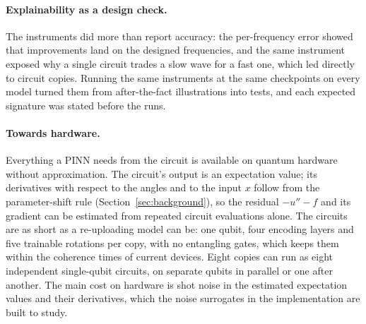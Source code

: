 \paragraph{Explainability as a design check.} The instruments did more than report
accuracy: the per-frequency error showed that improvements land on the designed
frequencies, and the same instrument exposed why a single circuit trades a slow wave for a
fast one, which led directly to circuit copies. Running the same instruments at the same
checkpoints on every model turned them from after-the-fact illustrations into tests,
and each expected signature was stated before the runs.

\paragraph{Towards hardware.} Everything a PINN needs from the circuit is available on
quantum hardware without approximation. The circuit's output is an expectation value;
its derivatives with respect to the angles and to the input $x$ follow from the
parameter-shift rule (Section~\ref{sec:background}), so the residual $-u''-f$ and its
gradient can be estimated from repeated circuit evaluations alone. The circuits are as
short as a re-uploading model can be: one qubit, four encoding layers and five trainable
rotations per copy, with no entangling gates, which keeps them within the coherence times
of current devices. Eight copies can run as eight independent single-qubit circuits, on
separate qubits in parallel or one after another. The main cost on hardware is shot
noise in the estimated expectation values and their derivatives, which the noise
surrogates in the implementation are built to study.
